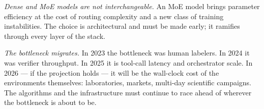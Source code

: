\documentclass[11pt,a4paper]{article}
\theoremstyle{definition}
\theoremstyle{plain}
\begin{document}
\emph{Dense and MoE models are not interchangeable.} An MoE model brings parameter efficiency at the cost of routing complexity and a new class of training instabilities. The choice is architectural and must be made early; it ramifies through every layer of the stack.

\emph{The bottleneck migrates.} In 2023 the bottleneck was human labelers. In 2024 it was verifier throughput. In 2025 it is tool-call latency and orchestrator scale. In 2026 --- if the projection holds --- it will be the wall-clock cost of the environments themselves: laboratories, markets, multi-day scientific campaigns. The algorithms and the infrastructure must continue to race ahead of wherever the bottleneck is about to be.
\end{document}
